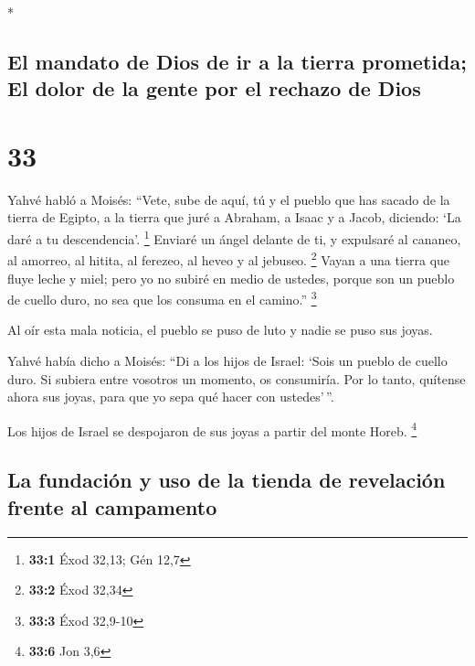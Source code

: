 \begin{paracol}{2}
\begin{otherlanguage}{english}
\end{otherlanguage}

\switchcolumn[0]*

\hypertarget{el-mandato-de-dios-de-ir-a-la-tierra-prometida-el-dolor-de-la-gente-por-el-rechazo-de-dios}{%
\subsection{El mandato de Dios de ir a la tierra prometida; El dolor de
la gente por el rechazo de
Dios}\label{el-mandato-de-dios-de-ir-a-la-tierra-prometida-el-dolor-de-la-gente-por-el-rechazo-de-dios}}

\hypertarget{section-64}{%
\section{33}\label{section-64}}

 Yahvé habló a Moisés: ``Vete, sube de aquí, tú y el
pueblo que has sacado de la tierra de Egipto, a la tierra que juré a
Abraham, a Isaac y a Jacob, diciendo: `La daré a tu descendencia'.
\footnote{\textbf{33:1} Éxod 32,13; Gén 12,7}  Enviaré un
ángel delante de ti, y expulsaré al cananeo, al amorreo, al hitita, al
ferezeo, al heveo y al jebuseo. \footnote{\textbf{33:2} Éxod 32,34}
 Vayan a una tierra que fluye leche y miel; pero yo no
subiré en medio de ustedes, porque son un pueblo de cuello duro, no sea
que los consuma en el camino.'' \footnote{\textbf{33:3} Éxod 32,9-10}

 Al oír esta mala noticia, el pueblo se puso de luto y
nadie se puso sus joyas.

 Yahvé había dicho a Moisés: ``Di a los hijos de Israel:
`Sois un pueblo de cuello duro. Si subiera entre vosotros un momento, os
consumiría. Por lo tanto, quítense ahora sus joyas, para que yo sepa qué
hacer con ustedes'\,''.

 Los hijos de Israel se despojaron de sus joyas a partir
del monte Horeb. \footnote{\textbf{33:6} Jon 3,6}

\hypertarget{la-fundaciuxf3n-y-uso-de-la-tienda-de-revelaciuxf3n-frente-al-campamento}{%
\subsection{La fundación y uso de la tienda de revelación frente al
campamento}\label{la-fundaciuxf3n-y-uso-de-la-tienda-de-revelaciuxf3n-frente-al-campamento}}


\end{paracol}
